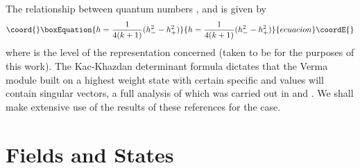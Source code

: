 \documentclass[a4paper,12pt]{article}
\def\hf          {\tfrac{1}{2}}
\begin{document}
The relationship between quantum numbers \coordHE{}, \coordHE{} and \coordHE{} is given by
\begin{equation}\coord{}\boxEquation{
h=\frac{1}{4(k+1)}(h_-^2-h_+^2)
}{
h=\frac{1}{4(k+1)}(h_-^2-h_+^2)
}{ecuacion}\coordE{}\end{equation}
where \coordHE{} is the level of the representation concerned (taken to be
\myHighlight{$\hf$}\coordHE{} for the purposes of this work).  The Kac-Khazdan determinant
formula dictates that the Verma module built on a highest weight state
with certain specific \coordHE{} and \coordHE{} values will contain singular
vectors, a full analysis of which was carried out in \cite{BT97} and
\cite{BHT98}.  We shall make extensive use of the results of these
references for the \myHighlight{$k=-\hf$}\coordHE{} case.



\section{Fields and States}
\end{document}
